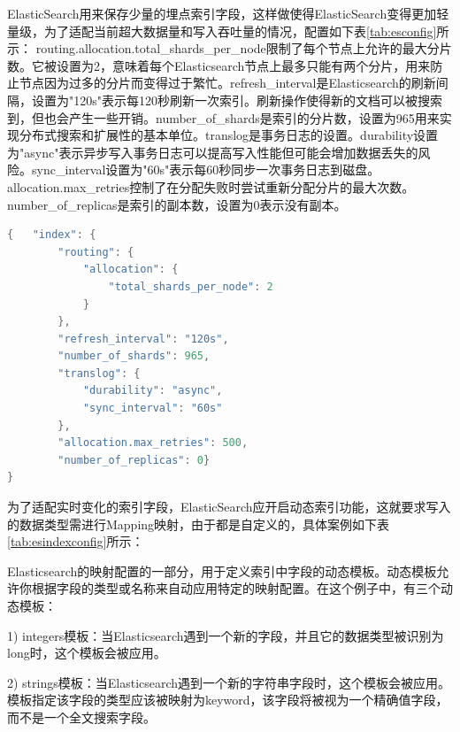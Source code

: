\begin{longtable}[htbp]
ElasticSearch用来保存少量的埋点索引字段，这样做使得ElasticSearch变得更加轻量级，为了适配当前超大数据量和写入吞吐量的情况，配置如下表\ref{tab:esconfig}所示：
routing.allocation.total\_shards\_per\_node限制了每个节点上允许的最大分片数。它被设置为2，意味着每个Elasticsearch节点上最多只能有两个分片，用来防止节点因为过多的分片而变得过于繁忙。refresh\_interval是Elasticsearch的刷新间隔，设置为"120s"表示每120秒刷新一次索引。刷新操作使得新的文档可以被搜索到，但也会产生一些开销。number\_of\_shards是索引的分片数\cite{wei2020optimization}，设置为965用来实现分布式搜索和扩展性的基本单位。translog是事务日志的设置。durability设置为"async"表示异步写入事务日志可以提高写入性能但可能会增加数据丢失的风险。sync\_interval设置为"60s"表示每60秒同步一次事务日志到磁盘。allocation.max\_retries控制了在分配失败时尝试重新分配分片的最大次数。number\_of\_replicas是索引的副本数，设置为0表示没有副本。

\begin{lrbox}{\esconfigbox}  
\begin{lstlisting}[language=Java]  
{   "index": {
        "routing": {
            "allocation": {
                "total_shards_per_node": 2
            }
        },
        "refresh_interval": "120s",
        "number_of_shards": 965,
        "translog": {
            "durability": "async",
            "sync_interval": "60s"
        },
        "allocation.max_retries": 500,
        "number_of_replicas": 0}
}
\end{lstlisting}  
\end{lrbox} 

\begin{table}[h]    
\caption{ElasticSearch setting配置信息}  
\label{tab:esconfig}  
\usebox{\esconfigbox}  
\end{table}  



为了适配实时变化的索引字段，ElasticSearch应开启动态索引功能，这就要求写入的数据类型需进行Mapping映射，由于都是自定义的，具体案例如下表\ref{tab:esindexconfig}所示：

Elasticsearch的映射配置的一部分，用于定义索引中字段的动态模板。动态模板允许你根据字段的类型或名称来自动应用特定的映射配置。在这个例子中，有三个动态模板：

1)	integers模板：当Elasticsearch遇到一个新的字段，并且它的数据类型被识别为long时，这个模板会被应用。

2)	strings模板：当Elasticsearch遇到一个新的字符串字段时，这个模板会被应用。模板指定该字段的类型应该被映射为keyword，该字段将被视为一个精确值字段，而不是一个全文搜索字段。


\end{longtable}
